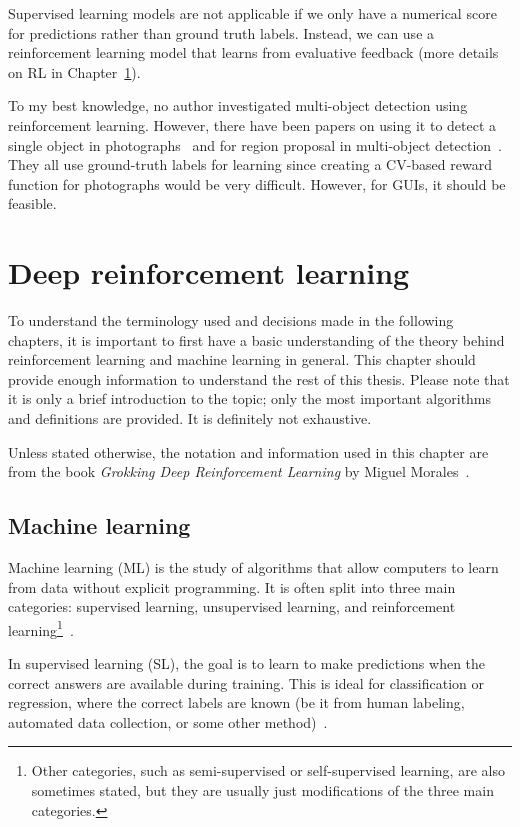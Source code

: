 \documentclass[
  digital,     %
  oneside,     %
  nosansbold,  %
  nocolorbold, %
  lof,         %
  lot,         %
]{fithesis4}
\begin{document}
Supervised learning models are not applicable if we only have a numerical score for predictions rather than ground truth labels. Instead, we can use a reinforcement learning model that learns from evaluative feedback (more details on RL in Chapter~\ref{ch:dlr}).

To my best knowledge, no author investigated multi-object detection using reinforcement learning. However, there have been papers on using it to detect a single object in photographs~\cite{iterative_od_with_rl, hierarchical_od_with_drl} and for region proposal in multi-object detection~\cite{drl_rpn}. They all use ground-truth labels for learning since creating a CV-based reward function for photographs would be very difficult. However, for GUIs, it should be feasible. 

\chapter{Deep reinforcement learning}
\label{ch:dlr}

To understand the terminology used and decisions made in the following chapters, it is important to first have a basic understanding of the theory behind reinforcement learning and machine learning in general. This chapter should provide enough information to understand the rest of this thesis. Please note that it is only a brief introduction to the topic; only the most important algorithms and definitions are provided. It is definitely not exhaustive.

Unless stated otherwise, the notation and information used in this chapter are from the book \textit{Grokking Deep Reinforcement Learning} by Miguel Morales~\cite{GDRL}.

\section{Machine learning}
Machine learning (ML) is the study of algorithms that allow computers to learn from data without explicit programming. It is often split into three main categories: supervised learning, unsupervised learning, and reinforcement learning\footnote{Other categories, such as semi-supervised or self-supervised learning, are also sometimes stated, but they are usually just modifications of the three main categories.}~\cite{IB031}.

In supervised learning (SL), the goal is to learn to make predictions when the correct answers are available during training. This is ideal for classification or regression, where the correct labels are known (be it from human labeling, automated data collection, or some other method)~\cite{IB031}.
\end{document}
